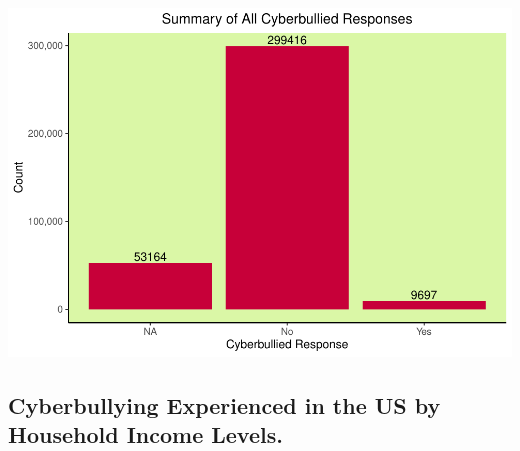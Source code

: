 \documentclass[
  man,LLO-8200, Introduction to Data Science]{apa6}
\begin{document}
\includegraphics{CyberBully_files/figure-latex/SummarizeCyberbullyResponses-1.pdf}

\hypertarget{cyberbullying-experienced-in-the-us-by-household-income-levels.}{%
\subsection{Cyberbullying Experienced in the US by Household Income Levels.}\label{cyberbullying-experienced-in-the-us-by-household-income-levels.}}
\end{document}
